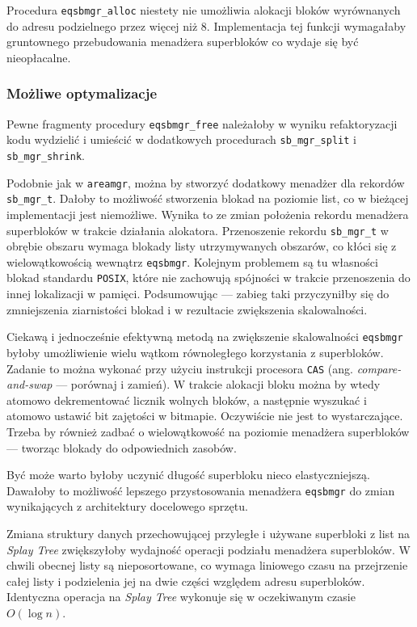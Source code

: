 \documentclass[12pt,a4paper,titlepage,twoside]{mwart}
\begin{document}
Procedura \verb+eqsbmgr_alloc+ niestety nie umożliwia alokacji bloków
wyrównanych do adresu podzielnego przez więcej niż 8. Implementacja tej funkcji
wymagałaby gruntownego przebudowania menadżera superbloków co wydaje się być
nieopłacalne.

\subsubsection{Możliwe optymalizacje}

Pewne fragmenty procedury \verb+eqsbmgr_free+ należałoby w wyniku
refaktoryzacji kodu wydzielić i umieścić w dodatkowych procedurach
\verb+sb_mgr_split+ i \verb+sb_mgr_shrink+.

Podobnie jak w \texttt{areamgr}, można by stworzyć dodatkowy menadżer dla
rekordów \verb+sb_mgr_t+. Dałoby to możliwość stworzenia blokad na poziomie
list, co w bieżącej implementacji jest niemożliwe. Wynika to ze zmian
położenia rekordu menadżera superbloków w trakcie działania alokatora.
Przenoszenie rekordu \verb+sb_mgr_t+ w obrębie obszaru wymaga blokady listy
utrzymywanych obszarów, co kłóci się z wielowątkowością wewnątrz
\texttt{eqsbmgr}. Kolejnym problemem są tu własności blokad standardu
\texttt{POSIX}, które nie zachowują spójności w trakcie przenoszenia do innej
lokalizacji w pamięci. Podsumowując --- zabieg taki przyczyniłby się do
zmniejszenia ziarnistości blokad i w rezultacie zwiększenia skalowalności.

Ciekawą i jednocześnie efektywną metodą na zwiększenie skalowalności
\texttt{eqsbmgr} byłoby umożliwienie wielu wątkom równoległego korzystania z
superbloków.  Zadanie to można wykonać przy użyciu instrukcji procesora
\verb+CAS+ (ang. \textit{compare-and-swap} --- porównaj i zamień).  W trakcie
alokacji bloku można by wtedy atomowo dekrementować licznik wolnych bloków, a
następnie wyszukać i atomowo ustawić bit zajętości w bitmapie. Oczywiście nie
jest to wystarczające. Trzeba by również zadbać o wielowątkowość na poziomie
menadżera superbloków --- tworząc blokady do odpowiednich zasobów.

Być może warto byłoby uczynić długość superbloku nieco elastyczniejszą.
Dawałoby to możliwość lepszego przystosowania menadżera \texttt{eqsbmgr} do
zmian wynikających z architektury docelowego sprzętu.

Zmiana struktury danych przechowującej przyległe i używane superbloki z list na
\textit{Splay Tree} zwiększyłoby wydajność operacji podziału menadżera
superbloków. W chwili obecnej listy są nieposortowane, co wymaga liniowego
czasu na przejrzenie całej listy i podzielenia jej na dwie części względem
adresu superbloków. Identyczna operacja na \textit{Splay Tree} wykonuje się w
oczekiwanym czasie $O(\log n)$.
\end{document}
